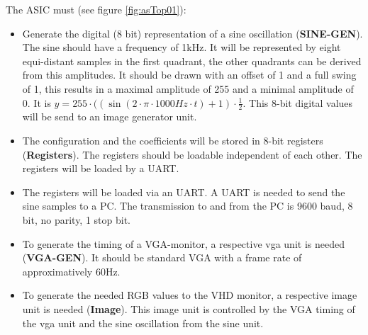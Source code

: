 The ASIC must (see figure \ref{fig:asTop01}):
\begin{itemize}
  \item Generate the digital (8 bit) representation of a sine oscillation (\textbf{SINE-GEN}). The sine should have a frequency of 1\;kHz. It will be represented by eight equi-distant samples in the first quadrant, the other quadrants can be derived from this amplitudes. It should be drawn with an offset of 1 and a full swing of 1, this results in a maximal amplitude of 255 and a minimal amplitude of 0. It is $y = 255 \cdot ((\sin(2 \cdot \pi \cdot 1000 Hz \cdot t) + 1) \cdot \frac{1}{2}$. This 8-bit digital values will be send to an image generator unit.
  \item The configuration and the coefficients will be stored in 8-bit registers (\textbf{Registers}). The registers should be loadable independent of each other. The registers will be loaded by a UART.
  \item The registers will be loaded via an UART. A UART is needed to send the sine samples to a PC. The transmission to and from the PC is 9600 baud, 8 bit, no parity, 1 stop bit.
  \item To generate the timing of a VGA-monitor, a respective vga unit is needed (\textbf{VGA-GEN}). It should be standard VGA with a frame rate of approximatively 60\;Hz.
  \item To generate the needed RGB values to the VHD monitor, a respective image unit is needed (\textbf{Image}). This image unit is controlled by the VGA timing of the vga unit and the sine oscillation from the sine unit.
\end{itemize}
